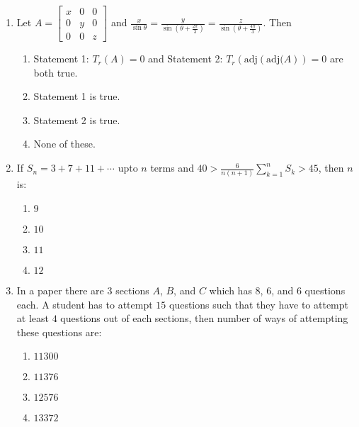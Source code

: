 \documentclass[journal]{IEEEtran}
\newcommand{\brak}[1]{\left( #1 \right)}
\newcommand{\gt}{>}
\begin{document}
\begin{enumerate}
        \begin{multicols}{4}
        \begin{enumerate}
        \item $15$
        \item $-15$
        \item $20$
        \item $-20$
        \end{enumerate}
        \end{multicols}
        
    \item Let $A=\begin{bmatrix}x&0&0\\0&y&0\\0&0&z\end{bmatrix}$ and $\frac{x}{\sin\theta}=\frac{y}{\sin\left(\theta+\frac{2\pi}{3}\right)}=\frac{z}{\sin\left(\theta+\frac{4\pi}{3}\right)}$. Then

        \begin{enumerate}
        \item Statement 1: $T_{r}\brak{A}=0$ and Statement 2: $T_{r}\brak{\text{adj}\brak{\text{adj}(A}}=0$ are both true.
        \item Statement 1 is true.
        \item Statement 2 is true.
        \item None of these.
        \end{enumerate}
        
    \item If $S_{n}=3+7+11+\cdots$ upto $n$ terms and $40\gt\frac{6}{n\brak{n+1}}\sum_{k=1}^{n}S_{k}\gt45$, then $n$ is:

        \begin{multicols}{4}
        \begin{enumerate}
        \item $9$
        \item $10$
        \item $11$
        \item $12$
        \end{enumerate}
        \end{multicols}

    \item In a paper there are $3$ sections $A$, $B$, and $C$ which has $8$, $6$, and $6$ questions each. A student has to attempt $15$ questions such that they have to attempt at least $4$ questions out of each sections, then number of ways of attempting these questions are:

        \begin{multicols}{4}
        \begin{enumerate}
        \item $11300$
        \item $11376$
        \item $12576$
        \item $13372$
        \end{enumerate}
        \end{multicols}

\end{enumerate}
\end{document}
